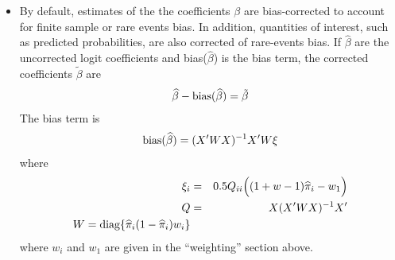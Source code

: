 \documentclass[letterpaper,10pt,english]{sphinxmanual}
\begin{document}
\begin{itemize}
\item {} 
By default, estimates of the the coefficients \(\beta\) are
bias-corrected to account for finite sample or rare events bias. In
addition, quantities of interest, such as predicted probabilities,
are also corrected of rare-events bias. If \(\widehat{\beta}\)
are the uncorrected logit coefficients and
bias(\(\widehat{\beta}\)) is the bias term, the corrected
coefficients \(\tilde{\beta}\) are
\begin{gather}
\begin{split}\widehat{\beta} - \textrm{bias}(\widehat{\beta}) = \tilde{\beta}\end{split}\notag
\end{gather}
The bias term is
\begin{gather}
\begin{split}\textrm{bias}(\widehat{\beta}) = (X'WX)^{-1} X'W \xi\end{split}\notag
\end{gather}
where
\begin{gather}
\begin{split}\begin{aligned}
\xi_i &=& 0.5 Q_{ii} \Big( (1 + w-1)\widehat{\pi}_i - w_1 \Big) \\
Q &=& X(X'WX)^{-1} X' \\
W = \textrm{diag}\{\widehat{\pi}_i (1 - \widehat{\pi}_i) w_i\}\end{aligned}\end{split}\notag
\end{gather}
where \(w_i\) and \(w_1\) are given in the “weighting”
section above.

\end{itemize}
\end{document}
